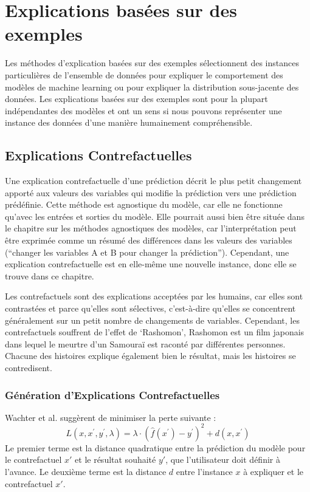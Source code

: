 \section{Explications basées sur des exemples}

Les méthodes d'explication basées sur des exemples sélectionnent des instances particulières de l'ensemble de données pour expliquer le comportement des modèles de machine learning ou pour expliquer la distribution sous-jacente des données.
Les explications basées sur des exemples sont pour la plupart indépendantes des modèles et ont un sens si nous pouvons représenter une instance des données d'une manière humainement compréhensible.

\subsection{Explications Contrefactuelles}
Une explication contrefactuelle d'une prédiction décrit le plus petit changement apporté aux valeurs des variables qui modifie la prédiction vers une prédiction prédéfinie. Cette méthode est agnostique du modèle, car elle ne fonctionne qu'avec les entrées et sorties du modèle. Elle pourrait aussi bien être située dans le chapitre sur les méthodes agnostiques des modèles, car l'interprétation peut être exprimée comme un résumé des différences dans les valeurs des variables (``changer les variables A et B pour changer la prédiction''). Cependant, une explication contrefactuelle est en elle-même une nouvelle instance, donc elle se trouve dans ce chapitre.

Les contrefactuels sont des explications acceptées par les humains, car elles sont contrastées et parce qu'elles sont sélectives, c'est-à-dire qu'elles se concentrent généralement sur un petit nombre de changements de variables. Cependant, les contrefactuels souffrent de l'effet de `Rashomon', Rashomon est un film japonais dans lequel le meurtre d'un Samouraï est raconté par différentes personnes. Chacune des histoires explique également bien le résultat, mais les histoires se contredisent.

\subsubsection{Génération d'Explications Contrefactuelles}
Wachter et al. suggèrent de minimiser la perte suivante :
\[
L(x,x^\prime,y^\prime,\lambda)=\lambda\cdot(\hat{f}(x^\prime)-y^\prime)^2+d(x,x^\prime)
\]
Le premier terme est la distance quadratique entre la prédiction du modèle pour le contrefactuel \(x'\) et le résultat souhaité \(y'\), que l'utilisateur doit définir à l'avance.
Le deuxième terme est la distance \(d\) entre l'instance \(x\) à expliquer et le contrefactuel \(x'\).

